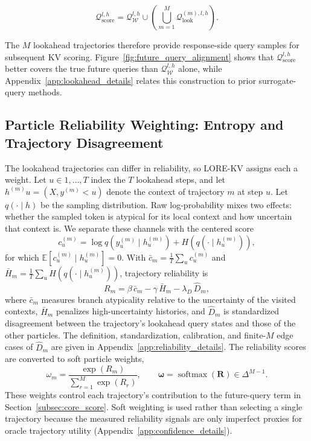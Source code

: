 \documentclass{article} %
\begin{document}
\begin{equation}
\mathcal{Q}^{l,h}_{\mathrm{score}}
=
\mathcal{Q}^{l,h}_{\mathcal{W}}
\cup
\left(
\bigcup_{m=1}^{M}
\mathcal{Q}^{(m),l,h}_{\mathrm{look}}
\right).
\label{eq:score_queries}
\end{equation}

The $M$ lookahead trajectories therefore provide response-side query samples for subsequent KV scoring. Figure~\ref{fig:future_query_alignment} shows that $\mathcal{Q}^{l,h}_{\mathrm{score}}$ better covers the true future queries than $\mathcal{Q}^{l,h}_{\mathcal{W}}$ alone, while Appendix~\ref{app:lookahead_details} relates this construction to prior surrogate-query methods.

\subsection{Particle Reliability Weighting: Entropy and Trajectory Disagreement} \label{subsec:confidence}

The lookahead trajectories can differ in reliability, so LORE-KV assigns each a weight. Let $u\in{1,\ldots,T}$ index the $T$ lookahead steps, and let $h^{(m)}u=(X,y^{(m)}{<u})$ denote the context of trajectory $m$ at step $u$. Let $q(\cdot\mid h)$ be the sampling distribution. Raw log-probability mixes two effects: whether the sampled token is atypical for its local context and how uncertain that context is. We separate these channels with the centered score
\begin{equation}
 c^{(m)}_u
 =\log q\!\left(y^{(m)}_u\mid h^{(m)}_u\right)
 +H\!\left(q(\cdot\mid h^{(m)}_u)\right),
 \label{eq:centered_score}
\end{equation}
for which $\mathbb{E}[c^{(m)}_u\mid h^{(m)}_u]=0$. With $\bar c_m=\tfrac1T\sum_u c^{(m)}_u$ and $\bar H_m=\tfrac1T\sum_u H(q(\cdot\mid h^{(m)}_u))$, trajectory reliability is
\begin{equation}
 R_m=\beta\,\bar c_m-\gamma\,\bar H_m-\lambda_D\,\hat D_m,
 \label{eq:confidence}
\end{equation}
where $\bar c_m$ measures branch atypicality relative to the uncertainty of the visited contexts, $\bar H_m$ penalizes high-uncertainty histories, and $\hat D_m$ is standardized disagreement between the trajectory's lookahead query states and those of the other particles. The definition, standardization, calibration, and finite-$M$ edge cases of $\hat D_m$ are given in Appendix~\ref{app:reliability_details}. The reliability scores are converted to soft particle weights,
\begin{equation}
 \omega_m=\frac{\exp(R_m)}{\sum_{r=1}^{M}\exp(R_r)},
 \qquad
 \boldsymbol{\omega}=\operatorname{softmax}(\mathbf{R})\in\Delta^{M-1}.
 \label{eq:particle_weight}
\end{equation}
These weights control each trajectory's contribution to the future-query term in Section~\ref{subsec:core_score}. Soft weighting is used rather than selecting a single trajectory because the measured reliability signals are only imperfect proxies for oracle trajectory utility (Appendix~\ref{app:confidence_details}).
\end{document}
